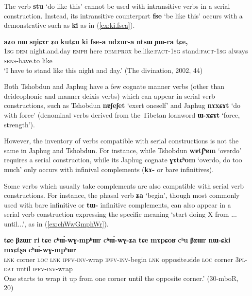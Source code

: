 \documentclass[oneside,a4paper,11pt]{article}
\newcommand{\ipa}[1]{\textbf{\phon#1}} %
\newcommand{\jpg}[2]{\ipa{#1} `#2'} %
\begin{document}
The verb \jpg{stu}{do like this} cannot be used with intransitive verbs in a serial construction. Instead, its intransitive counterpart \jpg{fse}{be like this} occurs with a demonstrative such as \ipa{ki} as in (\ref{ex:ki.fsea}).

\begin{exe}
\ex \label{ex:ki.fsea}
\gll \ipa{aʑo} 	\ipa{nɯ} 	\ipa{sŋiɕɤr} 	\ipa{ʑo} 	\ipa{kutɕu} 	\ipa{ki} 	\ipa{fse-a} 	\ipa{ndzur-a} 	\ipa{ntsɯ} 	\ipa{ɲɯ-ra} 	\ipa{tɕe,} \\
\textsc{1sg} \textsc{dem} night.and.day \textsc{emph} here \textsc{dem:prox} be.like:\textsc{fact-1sg} stand:\textsc{fact-1sg} always \textsc{sens}-have.to like \\
\glt `I have to stand like this night and day.' (The divination, 2002, 44)
\end{exe}




Both Tshobdun and Japhug have a few cognate manner verbs (other than deideophonic and manner deixis verbs) which can appear in serial verb constructions, such as Tshobdun \jpg{nɐʃeʃet}{exert oneself} and Japhug  \jpg{nɤxɕɤt}{do with force}  (denominal verbs derived from the Tibetan loanword \jpg{ɯ-xɕɤt}{force, strength}).

However, the inventory of verbs compatible with serial constructions is not the same in Japhug and Tshobdun. For instance, while Tshobdun \jpg{wɐtʃʰɐm}{overdo} requires a serial construction, while its Japhug cognate \jpg{ɣɤtɕʰom}{overdo, do too much}  only occurs with infinival complements (\ipa{kɤ-} or bare infinitives).

Some verbs which usually take complements are also compatible with serial verb constructions. 
 For instance, the phasal verb \jpg{ʑa}{begin}, though most commonly used with bare infinitive or \ipa{tɯ-} infinitive complements, can also appear in a serial verb construction expressing the specific meaning `start doing X from ... until...', as in (\ref{ex:chWwGmphWr}).

   \begin{exe}
\ex \label{ex:chWwGmphWr}
 \gll  \ipa{tɕe} 	\ipa{βzɯr} 	\ipa{ri} 	\ipa{tɕe} 	\ipa{cʰɯ́-wɣ-mpʰɯr} 	\ipa{cʰɯ́-wɣ-ʑa} 	\ipa{tɕe} 	\ipa{mɤpɕoʁ} 	\ipa{cʰu} 	\ipa{βzɯr} 	\ipa{nɯ-ɕki} 	\ipa{mɤɕtʂa} 	\ipa{cʰɯ́-wɣ-mpʰɯr}  \\
 \textsc{lnk} corner \textsc{loc} \textsc{lnk} \textsc{ipfv-inv-}wrap \textsc{ipfv-inv-}begin \textsc{lnk}  opposite.side \textsc{loc} corner \textsc{3pl-dat} until \textsc{ipfv-inv-}wrap  \\
 \glt  One starts to wrap it up from one corner until the opposite corner.' (30-mboR, 20)
\end{exe}
 
\end{document}
